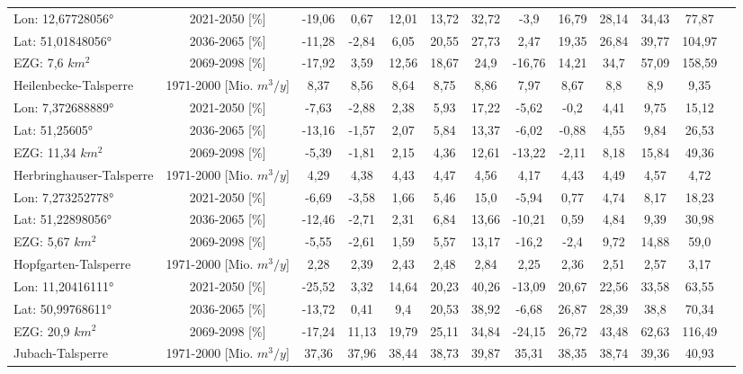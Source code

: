 \begin{longtable}{@{\extracolsep{\fill}}lc|ccccc||cccccc}
\cline{2-13} 
Lon: 12,67728056° & 2021-2050 [\%]  & -19,06 & 0,67 & 12,01 & 13,72 & 32,72 & -3,9 & 16,79 & 28,14 & 34,43 & 77,87 & \\ 
Lat: 51,01848056° & 2036-2065 [\%]  & -11,28 & -2,84 & 6,05 & 20,55 & 27,73 & 2,47 & 19,35 & 26,84 & 39,77 & 104,97 & \\ 
EZG: 7,6 $km^2$ & 2069-2098 [\%]  & -17,92 & 3,59 & 12,56 & 18,67 & 24,9 & -16,76 & 14,21 & 34,7 & 57,09 & 158,59 & \\ 
\hline 
Heilenbecke-Talsperre & 1971-2000 [Mio. $m^3/y$]  & 8,37 & 8,56 & 8,64 & 8,75 & 8,86 & 7,97 & 8,67 & 8,8 & 8,9 & 9,35 & \\ 
\cline{2-13} 
Lon: 7,372688889° & 2021-2050 [\%]  & -7,63 & -2,88 & 2,38 & 5,93 & 17,22 & -5,62 & -0,2 & 4,41 & 9,75 & 15,12 & \\ 
Lat: 51,25605° & 2036-2065 [\%]  & -13,16 & -1,57 & 2,07 & 5,84 & 13,37 & -6,02 & -0,88 & 4,55 & 9,84 & 26,53 & \\ 
EZG: 11,34 $km^2$ & 2069-2098 [\%]  & -5,39 & -1,81 & 2,15 & 4,36 & 12,61 & -13,22 & -2,11 & 8,18 & 15,84 & 49,36 & \\ 
\hline 
Herbringhauser-Talsperre & 1971-2000 [Mio. $m^3/y$]  & 4,29 & 4,38 & 4,43 & 4,47 & 4,56 & 4,17 & 4,43 & 4,49 & 4,57 & 4,72 & \\ 
\cline{2-13} 
Lon: 7,273252778° & 2021-2050 [\%]  & -6,69 & -3,58 & 1,66 & 5,46 & 15,0 & -5,94 & 0,77 & 4,74 & 8,17 & 18,23 & \\ 
Lat: 51,22898056° & 2036-2065 [\%]  & -12,46 & -2,71 & 2,31 & 6,84 & 13,66 & -10,21 & 0,59 & 4,84 & 9,39 & 30,98 & \\ 
EZG: 5,67 $km^2$ & 2069-2098 [\%]  & -5,55 & -2,61 & 1,59 & 5,57 & 13,17 & -16,2 & -2,4 & 9,72 & 14,88 & 59,0 & \\ 
\hline 
Hopfgarten-Talsperre & 1971-2000 [Mio. $m^3/y$]  & 2,28 & 2,39 & 2,43 & 2,48 & 2,84 & 2,25 & 2,36 & 2,51 & 2,57 & 3,17 & \\ 
\cline{2-13} 
Lon: 11,20416111° & 2021-2050 [\%]  & -25,52 & 3,32 & 14,64 & 20,23 & 40,26 & -13,09 & 20,67 & 22,56 & 33,58 & 63,55 & \\ 
Lat: 50,99768611° & 2036-2065 [\%]  & -13,72 & 0,41 & 9,4 & 20,53 & 38,92 & -6,68 & 26,87 & 28,39 & 38,8 & 70,34 & \\ 
EZG: 20,9 $km^2$ & 2069-2098 [\%]  & -17,24 & 11,13 & 19,79 & 25,11 & 34,84 & -24,15 & 26,72 & 43,48 & 62,63 & 116,49 & \\ 
\hline 
Jubach-Talsperre & 1971-2000 [Mio. $m^3/y$]  & 37,36 & 37,96 & 38,44 & 38,73 & 39,87 & 35,31 & 38,35 & 38,74 & 39,36 & 40,93 & \\ 

\end{longtable}
